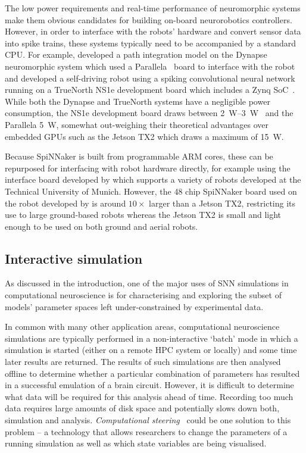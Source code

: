 \documentclass[utf8]{frontiersSCNS} %
\begin{document}
The low power requirements and real-time performance of neuromorphic systems make them obvious candidates for building on-board neurorobotics controllers.
However, in order to interface with the robots' hardware and convert sensor data into spike trains, these systems typically need to be accompanied by a standard CPU.
For example, \citet{Kreiser2018} developed a path integration model on the Dynapse~\citep{Qiao2015} neuromorphic system which used a Parallela~\citep{Olofsson2015} board to interface with the robot and \citet{Hwu2017} developed a self-driving robot using a spiking convolutional neural network running on a TrueNorth NS1e development board which includes a Zynq SoC~\citep{XilinxInc2018}.
While both the Dynapse and TrueNorth systems have a negligible power consumption, the NS1e development board draws between \SIrange{2}{3}{\watt}~\citep{Sawada2016} and the Parallela \SI{5}{\watt}, somewhat out-weighing their theoretical advantages over embedded GPUs such as the Jetson TX2 which draws a maximum of \SI{15}{\watt}.

Because SpiNNaker is built from programmable ARM cores, these can be repurposed for interfacing with robot hardware directly, for example using the interface board developed by \citet{Denk2013} which supports a variety of robots developed at the Technical University of Munich.
However, the 48 chip SpiNNaker board used on the robot developed by \citet{Conradt2015} is around $10\times$ larger than a Jetson TX2, restricting its use to large ground-based robots whereas the Jetson TX2 is small and light enough to be used on both ground and aerial robots.

\subsection{Interactive simulation}
As discussed in the introduction, one of the major uses of SNN simulations in computational neuroscience is for characterising and exploring the subset of models' parameter spaces left under-constrained by experimental data.

In common with many other application areas, computational neuroscience simulations are typically performed in a non-interactive `batch' mode in which a simulation is started (either on a remote HPC system or locally) and some time later results are returned.
The results of such simulations are then analysed offline to determine whether a particular combination of parameters has resulted in a successful emulation of a brain circuit.
However, it is difficult to determine what data will be required for this analysis ahead of time.
Recording too much data requires large amounts of disk space and potentially slows down both, simulation and analysis.
\textit{Computational steering}~\citep{Parker1997} could be one solution to this problem -- a technology that allows researchers to change the parameters of a running simulation as well as which state variables are being visualised.
\end{document}
